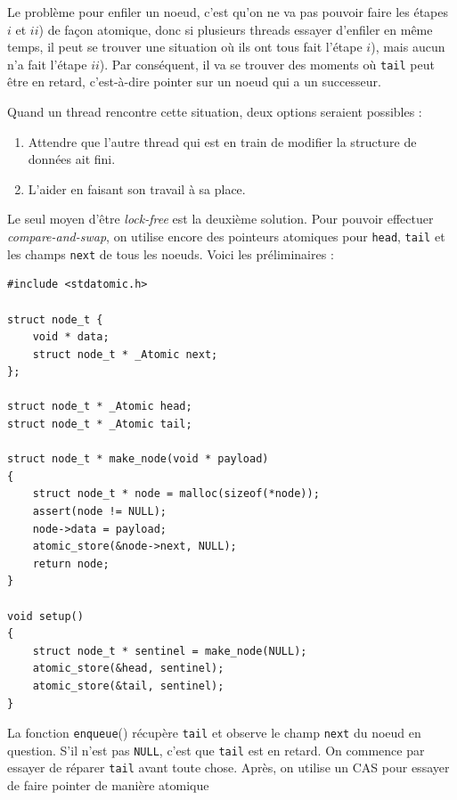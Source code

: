 Le problème pour enfiler un noeud, c'est qu'on ne va pas pouvoir faire les
étapes $i$ et $ii$) de façon atomique, donc si plusieurs threads essayer
d'enfiler en même temps, il peut se trouver une situation où ils ont tous fait
l'étape $i$), mais aucun n'a fait l'étape $ii$). Par conséquent, il va se
trouver des moments où \texttt{tail} peut \og être en retard\fg{}, c'est-à-dire
pointer sur un noeud qui a un successeur.

Quand un thread rencontre cette situation, deux options seraient possibles :
\begin{enumerate}
\item Attendre que l'autre thread qui est en train de modifier la structure de données ait fini.
\item L'aider en faisant son travail à sa place.
\end{enumerate}
\medskip

Le seul moyen d'être \emph{lock-free} est la deuxième solution. Pour pouvoir
effectuer \emph{compare-and-swap}, on utilise encore des pointeurs atomiques
pour \texttt{head}, \texttt{tail} et les champs \texttt{next} de tous les
noeuds. Voici les préliminaires :

\begin{verbatim}
#include <stdatomic.h>
	
struct node_t {
	void * data;
	struct node_t * _Atomic next;
};

struct node_t * _Atomic head;
struct node_t * _Atomic tail;

struct node_t * make_node(void * payload)
{
	struct node_t * node = malloc(sizeof(*node));
	assert(node != NULL);
	node->data = payload;
	atomic_store(&node->next, NULL);
	return node;
}

void setup()
{
	struct node_t * sentinel = make_node(NULL); 
	atomic_store(&head, sentinel);
	atomic_store(&tail, sentinel);
}
\end{verbatim}

La fonction \texttt{enqueue}() récupère \texttt{tail} et observe le champ
\texttt{next} du noeud en question. S'il n'est pas \texttt{NULL}, c'est que \og
\texttt{tail} est en retard\fg{}. On commence par essayer de réparer
\texttt{tail} avant toute chose. Après, on utilise un CAS pour essayer de faire pointer de manière atomique

